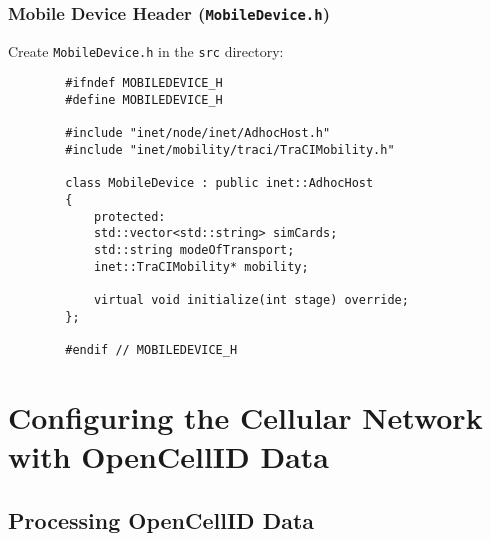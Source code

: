 \documentclass{article}
\begin{document}
	\subsubsection{Mobile Device Header (\texttt{MobileDevice.h})}
	
	Create \texttt{MobileDevice.h} in the \texttt{src} directory:
	
	\begin{verbatim}
		#ifndef MOBILEDEVICE_H
		#define MOBILEDEVICE_H
		
		#include "inet/node/inet/AdhocHost.h"
		#include "inet/mobility/traci/TraCIMobility.h"
		
		class MobileDevice : public inet::AdhocHost
		{
			protected:
			std::vector<std::string> simCards;
			std::string modeOfTransport;
			inet::TraCIMobility* mobility;
			
			virtual void initialize(int stage) override;
		};
		
		#endif // MOBILEDEVICE_H
	\end{verbatim}
	
	\section{Configuring the Cellular Network with OpenCellID Data}
	
	\subsection{Processing OpenCellID Data}
	
\end{document}
